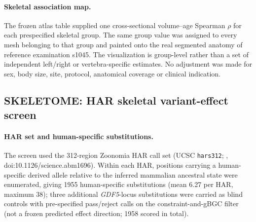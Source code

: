 \documentclass[11pt]{article}
\begin{document}
\paragraph{Skeletal association map.} The frozen atlas table supplied one
cross-sectional volume--age Spearman $\rho$ for each prespecified skeletal
group. The same group value was assigned to every mesh belonging to that group
and painted onto the real segmented anatomy of reference examination s1045.
The visualization is group-level rather than a set of independent left/right
or vertebra-specific estimates. No adjustment was made for sex, body size,
site, protocol, anatomical coverage or clinical indication.

\subsection{SKELETOME: HAR skeletal variant-effect screen}
\label{sec:methods-skeletome}

\paragraph{HAR set and human-specific substitutions.}
The screen used the \num{312}-region Zoonomia HAR call set (UCSC \texttt{hars312};
\citealp{keough2023hars}, doi:10.1126/science.abm1696). Within each HAR, positions carrying a
human-specific derived allele relative to the inferred mammalian ancestral state were enumerated,
giving \num{1955} human-specific substitutions (mean \num{6.27} per HAR, maximum \num{38}); three
additional \textit{GDF5}-locus substitutions were carried as blind controls with pre-specified
pass/reject calls on the constraint-and-gBGC filter (not a frozen predicted effect direction;
\num{1958} scored in total).
\end{document}
